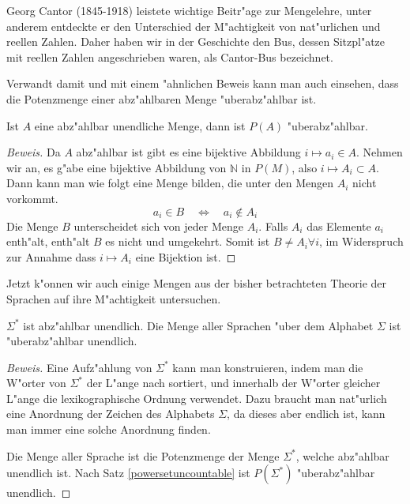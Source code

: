 Georg Cantor (1845-1918) leistete wichtige Beitr"age zur Mengelehre,
unter anderem entdeckte er den Unterschied der M"achtigkeit von
nat"urlichen und reellen Zahlen. Daher haben wir in der Geschichte
den Bus, dessen Sitzpl"atze mit reellen Zahlen angeschrieben waren,
als Cantor-Bus bezeichnet.

Verwandt damit und mit einem "ahnlichen Beweis kann man auch einsehen,
dass die Potenzmenge einer abz"ahlbaren Menge "uberabz"ahlbar ist.

\begin{satz}\label{powersetuncountable}
Ist $A$ eine abz"ahlbar unendliche Menge, dann ist $P(A)$
"uberabz"ahlbar.
\end{satz}

\begin{proof}[Beweis]
Da $A$ abz"ahlbar ist gibt es eine bijektive Abbildung 
$i\mapsto a_i\in A$. Nehmen wir an, es g"abe eine bijektive
Abbildung von $\mathbb N$ in $P(M)$, also $i\mapsto A_i\subset A$.
Dann kann man wie folgt eine Menge bilden, die unter den Mengen
$A_i$ nicht vorkommt.
\[
a_i\in B\quad\Leftrightarrow\quad a_i\not\in A_i
\]
Die Menge $B$ unterscheidet sich von jeder Menge $A_i$. Falls
$A_i$ das Elemente $a_i$ enth"alt, enth"alt $B$ es nicht und
umgekehrt. Somit ist $B\ne A_i\forall i$, im Widerspruch zur Annahme
dass $i\mapsto A_i$ eine Bijektion ist.
\end{proof}

Jetzt k"onnen wir auch einige Mengen aus der bisher betrachteten
Theorie der Sprachen auf ihre M"achtigkeit untersuchen.

\begin{satz}
$\Sigma^*$ ist abz"ahlbar unendlich. Die Menge aller Sprachen "uber dem
Alphabet $\Sigma$ ist "uberabz"ahlbar unendlich.
\end{satz}

\begin{proof}[Beweis]
Eine Aufz"ahlung von $\Sigma^*$ kann man konstruieren, indem man
die W"orter von $\Sigma^*$ der L"ange nach sortiert, und innerhalb
der W"orter gleicher L"ange die lexikographische Ordnung verwendet.
Dazu braucht man nat"urlich eine Anordnung der Zeichen des Alphabets $\Sigma$,
da dieses aber endlich ist, kann man immer eine solche Anordnung finden.

Die Menge aller Sprache ist die Potenzmenge der Menge $\Sigma^*$, welche
abz"ahlbar unendlich ist. Nach Satz \ref{powersetuncountable} ist
$P(\Sigma^*)$ "uberabz"ahlbar unendlich.
\end{proof}

